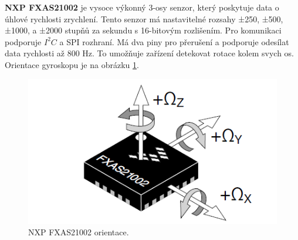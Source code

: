 \textbf{NXP FXAS21002} je vysoce výkonný 3-osy senzor, který poskytuje data o úhlové rychlosti
zrychlení. Tento senzor má nastavitelné rozsahy ±250, ±500, ±1000, a
±2000 stupňů za sekundu
s 16-bitovým rozlišením. Pro komunikaci podporuje $I^2C$ a SPI rozhraní.
Má dva piny pro přerušení a podporuje odesílat data rychlosti až 800 Hz.
To umožňuje zařízení detekovat rotace kolem svych os.
Orientace gyroskopu je na obrázku \ref{fig:FXAS_Orientation}\cite{FXAS21002}.

\begin{figure}[!h]
    \centering
    \includegraphics[width = 0.5\linewidth]{Figures/FXAS_Orientation.png}
    \caption{NXP FXAS21002 orientace\cite{FXAS21002}.}
    \label{fig:FXAS_Orientation}
\end{figure}

\endinput
